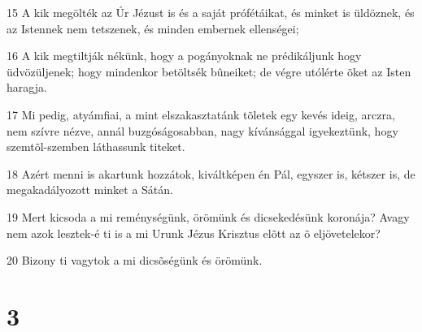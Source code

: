 \par 15 A kik megölték az Úr Jézust is és a saját prófétáikat, és minket is üldöznek, és az Istennek nem tetszenek, és minden embernek ellenségei;
\par 16 A kik megtiltják nékünk, hogy a pogányoknak ne prédikáljunk hogy üdvözüljenek; hogy mindenkor betöltsék bûneiket; de végre utólérte õket az Isten haragja.
\par 17 Mi pedig, atyámfiai, a mint elszakasztatánk tõletek egy kevés ideig, arczra, nem szívre nézve, annál buzgóságosabban, nagy kívánsággal igyekeztünk, hogy szemtõl-szemben láthassunk titeket.
\par 18 Azért menni is akartunk hozzátok, kiváltképen én Pál, egyszer is, kétszer is, de megakadályozott minket a Sátán.
\par 19 Mert kicsoda a mi reménységünk, örömünk és dicsekedésünk koronája? Avagy nem azok lesztek-é ti is a mi Urunk Jézus Krisztus elõtt az õ eljövetelekor?
\par 20 Bizony ti vagytok a mi dicsõségünk és örömünk.

\chapter{3}

